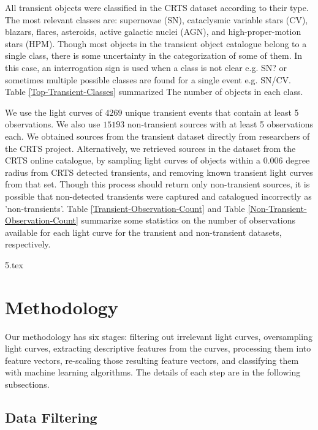 \documentclass[a4paper,fleqn,usenatbib]{mnras}
\begin{document}
All transient objects were classified in the CRTS dataset according to
their type. 
The most relevant classes are: supernovae (SN),
cataclysmic variable stars (CV), blazars, flares, asteroids, active
galactic nuclei (AGN), and high-proper-motion stars (HPM). 
Though most objects in the transient object catalogue belong to a single class,
there is some uncertainty in the categorization of some of
them. 
In this case, an interrogation sign is used when a class is not clear
e.g. SN? or sometimes multiple possible classes are found for a single
event e.g. SN/CV.
Table \ref{Top-Transient-Classes} summarized The number of objects in each class.


We use the light curves of $4269$ unique transient events that
contain at least 5 observations.
We also use $15193$ non-transient sources with at least 5 observations each. 
We obtained sources from the transient dataset directly from researchers of the CRTS project. Alternatively, we retrieved sources in the dataset from the
CRTS online catalogue, by sampling light curves of objects within a 0.006 
degree radius from CRTS detected transients, and removing known transient 
light curves from that set. 
Though this process should return only non-transient sources, it is
possible that non-detected transients were captured and catalogued
incorrectly as 'non-transients'.  
Table \ref{Transient-Observation-Count} and
Table \ref{Non-Transient-Observation-Count} summarize some statistics
on the number of observations available for each light curve for the
transient and non-transient datasets, respectively.  



{5.tex}


\section{Methodology} \label{section_method}

Our methodology has six stages: 
filtering out irrelevant light curves, oversampling light curves, extracting
descriptive features from the curves, processing them into feature
vectors, re-scaling those resulting feature vectors, and 
classifying them with machine learning algorithms. 
The details of each step are in the following subsections.

\subsection{Data Filtering} \label{subsection_filtering}
\end{document}
